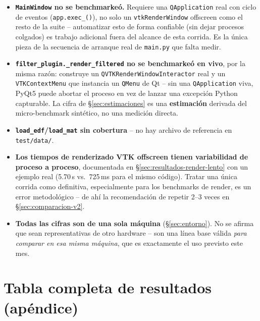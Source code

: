 \documentclass[11pt,a4paper]{article}
\begin{document}
\begin{itemize}
  \item \textbf{\texttt{MainWindow} no se benchmarkeó.} Requiere una \texttt{QApplication} real con ciclo de
        eventos (\texttt{app.exec\_\allowbreak ()}), no solo un \texttt{vtkRenderWindow} offscreen como el
        resto de la suite -- automatizar esto de forma confiable (sin dejar procesos colgados) es trabajo
        adicional fuera del alcance de esta corrida. Es la única pieza de la secuencia de arranque real de
        \texttt{main.py} que falta medir.
  \item \textbf{\texttt{filter\_\allowbreak plugin.\_\allowbreak render\_\allowbreak filtered} no se
        benchmarkeó en vivo}, por la misma razón: construye un \texttt{QVTKRenderWindowInteractor} real y un
        \texttt{VTKContextMenu} que instancia un \texttt{QMenu} de Qt -- sin una \texttt{QApplication} viva,
        PyQt5 puede abortar el proceso en vez de lanzar una excepción Python capturable. La cifra de
        \S\ref{sec:estimaciones} es una \textbf{estimación} derivada del micro-benchmark sintético, no una
        medición directa.
  \item \textbf{\texttt{load\_\allowbreak edf}/\texttt{load\_\allowbreak mat} sin cobertura} -- no hay
        archivo de referencia en \texttt{test/data/}.
  \item \textbf{Los tiempos de renderizado VTK offscreen tienen variabilidad de proceso a proceso}, documentada
        en \S\ref{sec:resultados-render-lento} con un ejemplo real (5.70\,s vs.\ 725\,ms para el mismo
        código). Tratar una única corrida como definitiva, especialmente para los benchmarks de render, es
        un error metodológico -- de ahí la recomendación de repetir 2--3 veces en
        \S\ref{sec:comparacion-v2}.
  \item \textbf{Todas las cifras son de una sola máquina} (\S\ref{sec:entorno}). No se afirma que sean
        representativas de otro hardware -- son una línea base válida \emph{para comparar en esa misma
        máquina}, que es exactamente el uso previsto este mes.
\end{itemize}

\section{Tabla completa de resultados (apéndice)}
\end{document}
